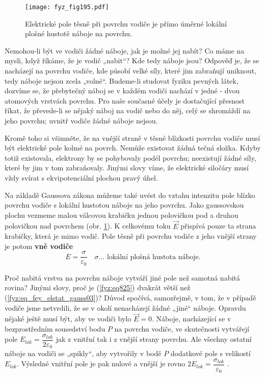   \begin{figure}[ht!]  %
    \centering
    \texttt{[image: fyz\_fig195.pdf]}
    \caption{Elektrické pole těsně při povrchu vodiče je přímo úměrné lokální plošné hustotě  
             náboje na povrchu.}
    \label{fyz:fig195}
  \end{figure} 
  Nemohou-li být ve vodiči žádné náboje, jak je možné jej nabít? Co máme na mysli, když říkáme, 
  že je vodič „nabit“? Kde tedy náboje jsou? Odpověď je, že se nacházejí na povrchu vodiče, kde 
  působí velké síly, které jim zabraňují uniknout, tedy náboje nejsou zcela „volné“. Budeme-li 
  studovat fyziku pevných látek, dozvíme se, že přebytečný náboj se v každém vodiči nachází v 
  jedné - dvou atomových vrstvách povrchu. Pro naše současné účely je dostačující přesnost 
  říkat, že převede-li se nějaký náboj na vodič nebo do něj, celý se shromáždí na jeho povrchu; 
  uvnitř vodiče žádné náboje nejsou. 
  
  Kromě toho si všimněte, že na vnější straně v těsné blízkosti povrchu vodiče musí být 
  elektrické pole kolmé na povrch. Nemůže existovat žádná tečná složka. Kdyby totiž existovala, 
  elektrony by se pohybovaly podél povrchu; neexistují žádné síly, které by jim v tom 
  zabraňovaly. Jinými slovy víme, že elektrické siločáry musí vždy svírat s ekvipotenciální 
  plochou pravý úhel.
  
  Na základě Gaussova zákona můžeme také uvést do vztahu intenzitu pole blízko povrchu vodiče s 
  lokální hustotou náboje na jeho povrchu. Jako gaussovskou plochu vezmeme malou válcovou 
  krabičku jednou polovičkou pod a druhou polovičkou nad povrchem (obr. 
  \ref{fyz:fig195}). K celkovému toku \(\vec{E}\) přispívá pouze ta strana 
  krabičky, která je mimo vodič. Pole těsně při povrchu vodiče z jeho vnější strany je potom 
  \textbf{vně vodiče}
  \begin{equation}\label{fyz:eq825}
    E = \frac{\sigma}{\varepsilon_0}  \quad\text{\(\sigma\ldots\) lokální plošná hustota 
    náboje}.
  \end{equation}
  
  Proč nabitá vrstva na povrchu náboje vytváří jiné pole než samotná nabitá rovina? Jinými 
  slovy, proč je (\ref{fyz:eq825}) dvakrát větší než 
  (\ref{fyz:eq_fey_elstat_gauss03})? Důvod spočívá, samozřejmě, v tom, že v případě vodiče jsme 
  netvrdili, že se v okolí nenacházejí žádné „jiné“ náboje. Opravdu nějaké ještě musí být, aby 
  ve vodiči bylo \(\vec{E} = 0\). Náboje, nacházející se v bezprostředním sousedství bodu \(P\) 
  na povrchu vodiče, ve skutečnosti vytvářejí pole \(E_{lok}= 
  \dfrac{\sigma_{lok}}{2\varepsilon_0}\) jak z vnitřní tak i z vnější strany povrchu. Ale 
  všechny ostatní náboje na vodiči se „spikly“, aby vytvořily v bodě \(P\) dodatkové pole s 
  velikostí \(E_{lok}\). Výsledné vnitřní pole je pak nulové a vnější je rovno \(2E_{lok} = 
  \dfrac{\sigma_{lok}}{\varepsilon_0}\) \cite[s.~93]{Feynman02}.
  
